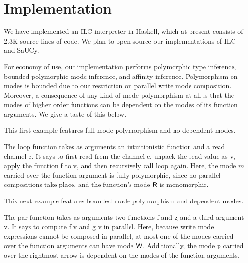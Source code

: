 \section{Implementation}
\label{sec:implementation}

We have implemented an ILC interpreter in Haskell, which at present consists of
2.3K source lines of code. We plan to open source our implementations of ILC and
SaUCy.

For economy of use, our implementation performs polymorphic type inference,
bounded polymorphic mode inference, and affinity inference. Polymorphism on
modes is bounded due to our restriction on parallel write mode
composition. Moreover, a consequence of any kind of mode polymorphism at all is
that the modes of higher order functions can be dependent on the modes of its
function arguments. We give a taste of this below.

This first example features full mode polymorphism and no dependent modes.

The \textsf{loop} function takes as arguments an intuitionistic function and a
read channel \textsf{c}.  It says to first read from the channel \textsf{c},
unpack the read value as \textsf{v}, apply the function \textsf{f} to
\textsf{v}, and then recursively call \textsf{loop} again. Here, the mode $m$
carried over the function argument is fully polymorphic, since no parallel
compositions take place, and the function's mode $\textsf{R}$ is monomorphic.

This next example features bounded mode polymorphism and dependent modes.

The \textsf{par} function takes as arguments two functions \textsf{f} and
\textsf{g} and a third argument \textsf{v}. It says to compute \textsf{f v} and
\textsf{g v} in parallel. Here, because write mode expressions cannot be
composed in parallel, at most one of the modes carried over the function
arguments can have mode $\textsf{W}$. Additionally, the mode \textsf{p} carried over
the rightmost arrow is dependent on the modes of the function arguments.
